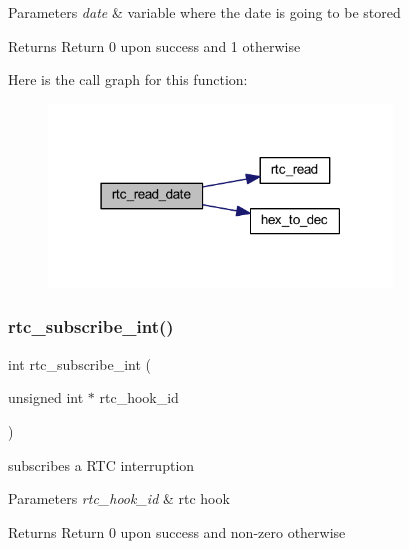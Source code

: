 \begin{DoxyParams}{Parameters}
{\em date} & variable where the date is going to be stored\\
\hline
\end{DoxyParams}
\begin{DoxyReturn}{Returns}
Return 0 upon success and 1 otherwise 
\end{DoxyReturn}
Here is the call graph for this function\+:\nopagebreak
\begin{figure}[H]
\begin{center}
\leavevmode
\includegraphics[width=259pt]{group__rtc_ga83dbab748017bcc8531622b94cca1be1_cgraph}
\end{center}
\end{figure}
\hypertarget{group__rtc_ga3b9f4583bad77c33ea0e82c1c1ad5305}{}\label{group__rtc_ga3b9f4583bad77c33ea0e82c1c1ad5305} 
\subsubsection{\texorpdfstring{rtc\+\_\+subscribe\+\_\+int()}{rtc\_subscribe\_int()}}
{\footnotesize\ttfamily int rtc\+\_\+subscribe\+\_\+int (\begin{DoxyParamCaption}\item[{unsigned int $\ast$}]{rtc\+\_\+hook\+\_\+id }\end{DoxyParamCaption})}



subscribes a R\+TC interruption 


\begin{DoxyParams}{Parameters}
{\em rtc\+\_\+hook\+\_\+id} & rtc hook\\
\hline
\end{DoxyParams}
\begin{DoxyReturn}{Returns}
Return 0 upon success and non-\/zero otherwise 
\end{DoxyReturn}
\hypertarget{group__rtc_ga61932ec1f55303bac55dea276d2a141f}{}\label{group__rtc_ga61932ec1f55303bac55dea276d2a141f} 
